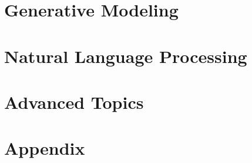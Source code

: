 \documentclass[oneside, a4paper,11pt]{book}
\begin{document}
\part{Generative Modeling}






% 

\part{Natural Language Processing}

\part{Advanced Topics}

\part{Appendix}


\backmatter

\nocite{*}


\end{document}
